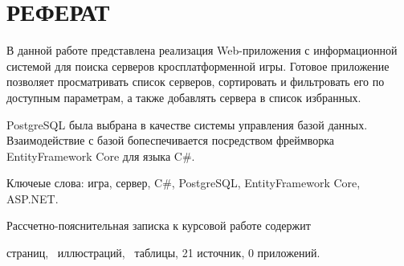 \chapter*{РЕФЕРАТ}

В данной работе представлена реализация Web-приложения с информационной системой для поиска серверов кросплатформенной игры. Готовое приложение позволяет просматривать список серверов, сортировать и фильтровать его по доступным параметрам, а также добавлять сервера в список избранных.

PostgreSQL была выбрана в качестве системы управления базой данных. Взаимодействие с базой бопеспечивается посредством фреймворка EntityFramework Core для языка C\#.

Ключеые слова: игра, сервер, C\#, PostgreSQL, EntityFramework Core, ASP.NET.

Рассчетно-пояснительная записка к курсовой работе содержит \begin{NoHyper}\pageref{LastPage}\end{NoHyper} страниц, \totfig~иллюстраций, \tottab~таблицы, 21 источник, 0 приложений. %
